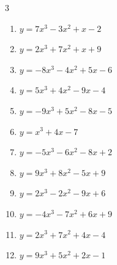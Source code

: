 \begin{multicols}{3}
\begin{enumerate}

  \item $y=7x^{3}-3x^{2}+x-2$


\columnbreak %

  \item $y=2x^{3}+7x^{2}+x+9$


  \item $y=-8x^{3}-4x^{2}+5x-6$


  \item $y=5x^{3}+4x^{2}-9x-4$


  \item $y=-9x^{3}+5x^{2}-8x-5$


  \item $y=x^{3}+4x-7$


  \item $y=-5x^{3}-6x^{2}-8x+2$


  \item $y=9x^{3}+8x^{2}-5x+9$


  \item $y=2x^{3}-2x^{2}-9x+6$


  \item $y=-4x^{3}-7x^{2}+6x+9$


  \item $y=2x^{3}+7x^{2}+4x-4$


  \item $y=9x^{3}+5x^{2}+2x-1$



\end{enumerate}
\end{multicols}
